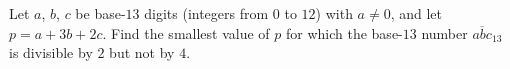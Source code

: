 Let $a$, $b$, $c$ be base-$13$ digits (integers from $0$ to $12$) with $a\ne0$, and let $p=a+3b+2c$. Find the smallest value of $p$ for which the base-$13$ number $\overline{abc}_{13}$ is divisible by $2$ but not by $4$.
